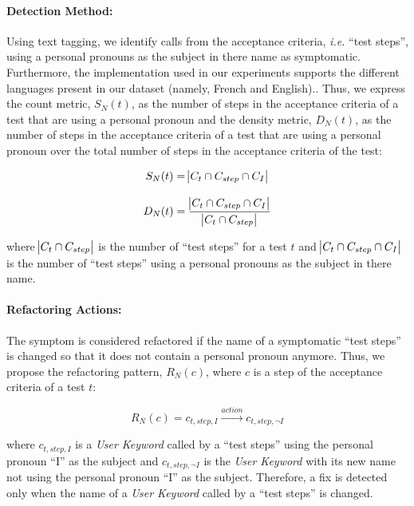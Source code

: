 \paragraph{Detection Method:}

Using text tagging, we identify calls from the acceptance criteria, \emph{i.e.} ``test steps'', using a personal pronouns as the subject in there name as symptomatic. Furthermore, the implementation used in our experiments supports the different languages present in our dataset (namely, French and English).. Thus, we express the count metric, $S_{N}(t)$, as the number of steps in the acceptance criteria of a test that are using a personal pronoun and the density metric, $D_{N}(t)$, as the number of steps in the acceptance criteria of a test that are using a personal pronoun over the total number of steps in the acceptance criteria of the test:

\begin{equation*}
    S_{N}(t) = \abs{C_{t} \cap C_{step} \cap C_{I}}
\end{equation*}

\begin{equation*}
    D_{N}(t) = \frac{\abs{C_{t} \cap C_{step} \cap C_{I}}}{\abs{C_{t} \cap C_{step}}}
\end{equation*}

where  $\abs{C_{t} \cap C_{step}}$ is the number of ``test steps'' for a test $t$ and $\abs{C_{t} \cap C_{step} \cap C_{I}}$ is the number of ``test steps'' using a personal pronouns as the subject in there name.

\paragraph{Refactoring Actions:}

The symptom is considered refactored if the name of a symptomatic ``test steps'' is changed so that it does not contain a personal pronoun anymore. Thus,  we propose the refactoring pattern, $R_{N}(c)$, where $c$ is a step of the acceptance criteria of a test $t$:

\begin{equation*}
    R_{N}(c) = c_{t, step, I} \xrightarrow{action} c_{t, step, \neg I}
\end{equation*}

where $c_{t, step, I}$ is a \emph{User Keyword} called by a ``test steps'' using the personal pronoun ``I'' as the subject and $c_{t, step, \neg I}$ is the \emph{User Keyword} with its new name not using the personal pronoun ``I'' as the subject. Therefore, a fix is detected only when the name of a \emph{User Keyword} called by a ``test steps'' is changed.

